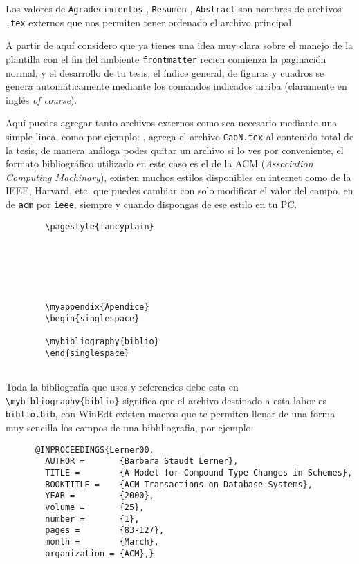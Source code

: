 Los valores de \verb"Agradecimientos" , \verb"Resumen" ,
\verb"Abstract" son nombres de archivos \verb" .tex" externos que
nos permiten tener ordenado el archivo principal.

A partir de aquí considero que ya tienes una idea muy clara sobre
el manejo de la plantilla con el fin del ambiente
\verb"frontmatter" recien comienza la paginación normal, y el
desarrollo de tu tesis, el índice general, de figuras y cuadros se
genera automáticamente mediante los comandos indicados arriba
(claramente en inglés \emph{of course}).

Aquí puedes agregar tanto archivos externos como sea necesario
mediante una simple linea, como por ejemplo:
\verb"", agrega el archivo \verb"CapN.tex" al
contenido total de la tesis, de manera análoga podes quitar un
archivo si lo ves por conveniente, el formato bibliográfico
utilizado en este caso es el de la ACM (\emph{Association
Computing Machinary}), existen muchos estilos disponibles en
internet como de la IEEE, Harvard, etc. que puedes cambiar con
solo modificar el valor del campo. en
\verb"" de \verb"acm" por \verb"ieee",
siempre y cuando dispongas de ese estilo en tu PC.

\begin{singlespace}
\begin{verbatim}
        \pagestyle{fancyplain}
        
        
        
        
        
        
        \myappendix{Apendice}
        \begin{singlespace}
        
        \mybibliography{biblio}
        \end{singlespace}
        
\end{verbatim}
\end{singlespace}


Toda la bibliografía que uses y referencies debe esta en
\verb"\mybibliography{biblio}" significa que el archivo destinado
a esta labor es \verb"biblio.bib", con WinEdt existen macros que
te permiten llenar de una forma muy sencilla los campos de una
bibbliografia, por ejemplo:

\begin{singlespace}
\begin{verbatim}
      @INPROCEEDINGS{Lerner00,
        AUTHOR =       {Barbara Staudt Lerner},
        TITLE =        {A Model for Compound Type Changes in Schemes},
        BOOKTITLE =    {ACM Transactions on Database Systems},
        YEAR =         {2000},
        volume =       {25},
        number =       {1},
        pages =        {83-127},
        month =        {March},
        organization = {ACM},}
\end{verbatim}
\end{singlespace}

